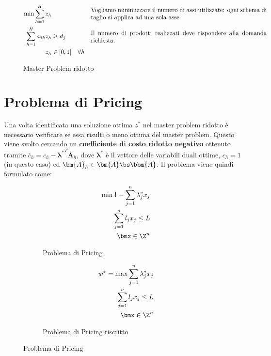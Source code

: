 \documentclass[\main/main.tex]{subfiles}
\begin{document}
\begin{figure}
    \begin{align*}
        \min \sum_{h=1}^{\bar{H}} z_h & &&\parbox{10cm}{Vogliamo minimizzare il numero di assi utilizzate: ogni schema di taglio si applica ad una sola asse.}\\
        \sum_{h=1}^{\bar{H}} a_{jh} z_h &\geq d_j && \parbox{10cm}{Il numero di prodotti realizzati deve rispondere alla domanda richiesta.}\\
        z_h &\in [0,1] \quad \forall h
    \end{align*}
    \caption{Master Problem ridotto}
\end{figure}

\clearpage
\section{Problema di Pricing}
Una volta identificata una soluzione ottima \(z^*\) nel master problem ridotto è necessario verificare se essa risulti o meno ottima del master problem. Questo viene svolto cercando un \textbf{coefficiente di costo ridotto negativo} ottenuto tramite \(\bar{c}_h = c_h - {\bm{\lambda}^*}^T \bm{A}_h\), dove \(\bm{\lambda}^*\) è il vettore delle variabili duali ottime, \(c_h=1\) (in questo caso) ed \(\bm{A}_h \in \bm{A}\bs \bbm{A}\). Il problema viene quindi formulato come:

\begin{figure}
    \begin{subfigure}{0.49\textwidth}
        \begin{align*}
            \min 1 - \sum_{j=1}^n \lambda_j^* x_j\\
            \sum_{j=1}^n l_j x_j \leq L\\
            \bmx \in \Z^n
        \end{align*}
        \caption{Problema di Pricing}
    \end{subfigure}
    \begin{subfigure}{0.49\textwidth}
        \begin{align*}
            w^* = \max \sum_{j=1}^n \lambda_j^* x_j\\
            \sum_{j=1}^n l_j x_j \leq L\\
            \bmx \in \Z^n
        \end{align*}
        \caption{Problema di Pricing riscritto}
    \end{subfigure}
    \caption{Problema di Pricing}
\end{figure}
\end{document}
